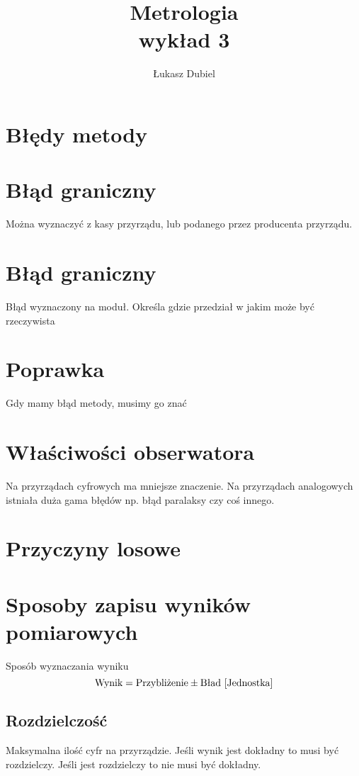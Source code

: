\documentclass[11pt]{article}
\author{Łukasz Dubiel}
\title{Metrologia\\ wykład 3}
\begin{document}
\maketitle

\section{Błędy metody}

\section{Błąd graniczny}
Można wyznaczyć z kasy przyrządu, lub podanego przez producenta przyrządu.

\section{Błąd graniczny}
Błąd wyznaczony na moduł. Określa gdzie przedział w jakim może być rzeczywista 

\section{Poprawka}
Gdy mamy błąd metody, musimy go znać 

\section{Właściwości obserwatora}
Na przyrządach cyfrowych ma mniejsze znaczenie. Na przyrządach analogowych istniała duża gama błędów np. błąd paralaksy czy coś innego.

\section{Przyczyny losowe}

\section{Sposoby zapisu wyników pomiarowych}
Sposób wyznaczania wyniku 
$$ \hbox{Wynik} = \hbox{Przybliżenie} \pm \hbox{Bład  [Jednostka]} $$

\subsection{Rozdzielczość}
Maksymalna ilość cyfr na przyrządzie. Jeśli wynik jest dokładny to musi być rozdzielczy. Jeśli jest rozdzielczy to nie musi być dokładny.
\end{document}
